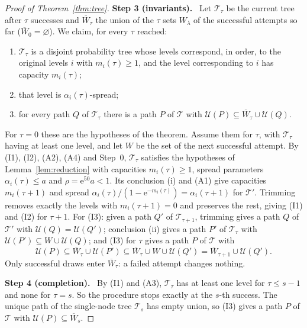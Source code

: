 \documentclass[11pt]{article}
\numberwithin{equation}{section}
\newcommand{\TT}{\mathcal T}
\newcommand{\UU}{\mathcal U}
\newcommand{\ee}{\mathrm e}
\newcommand{\step}[2]{\par\medskip\noindent\textbf{Step #1 (#2).}\ }
\begin{document}
\begin{proof}[Proof of Theorem~\ref{thm:tree}]
\step{3}{invariants}
Let $\TT_\tau$ be the current tree after $\tau$ successes and
$\overline W_\tau$ the union of the $\tau$ sets $W_\lambda$ of the
successful attempts so far ($\overline W_0=\varnothing$). We claim, for
every $\tau$ reached:
\begin{enumerate}[label=(I\arabic*),leftmargin=2.6em,itemsep=2pt]
 \item $\TT_\tau$ is a disjoint probability tree whose levels correspond,
 in order, to the original levels $i$ with $m_i(\tau)\ge1$, and the level
 corresponding to $i$ has capacity $m_i(\tau)$;
 \item that level is $\alpha_i(\tau)$-spread;
 \item for every path $Q$ of $\TT_\tau$ there is a path $P$ of $\TT$
 with $\UU(P)\subseteq\overline W_\tau\cup\UU(Q)$.
\end{enumerate}
For $\tau=0$ these are the hypotheses of the theorem. Assume them for
$\tau$, with $\TT_\tau$ having at least one level, and let $W$ be the
set of the next successful attempt. By (I1), (I2), (A2), (A4) and
Step~0, $\TT_\tau$ satisfies the hypotheses of
Lemma~\ref{lem:reduction} with capacities $m_i(\tau)\ge1$, spread
parameters $\alpha_i(\tau)\le a$ and $\rho=\ee^{50}a<1$. Its conclusion
(i) and (A1) give capacities $m_i(\tau+1)$ and spread
$\alpha_i(\tau)/(1-\ee^{-m_i(\tau)})=\alpha_i(\tau+1)$ for $\TT'$.
Trimming removes exactly the levels with $m_i(\tau+1)=0$ and preserves
the rest, giving (I1) and (I2) for $\tau+1$. For (I3): given a path
$Q'$ of $\TT_{\tau+1}$, trimming gives a path $Q$ of $\TT'$ with
$\UU(Q)=\UU(Q')$; conclusion (ii) gives a path $P'$ of $\TT_\tau$ with
$\UU(P')\subseteq W\cup\UU(Q)$; and (I3) for $\tau$ gives a path $P$ of
$\TT$ with
\[
 \UU(P)\subseteq\overline W_\tau\cup\UU(P')
 \subseteq\overline W_\tau\cup W\cup\UU(Q')
 =\overline W_{\tau+1}\cup\UU(Q').
\]
Only successful draws enter $\overline W_\tau$: a failed attempt changes
nothing.

\step{4}{completion}
By (I1) and (A3), $\TT_\tau$ has at least one level for $\tau\le s-1$
and none for $\tau=s$. So the procedure stops exactly at the $s$-th
success. The unique path of the single-node tree $\TT_s$ has empty
union, so (I3) gives a path $P$ of $\TT$ with
$\UU(P)\subseteq\overline W_s$.


\end{proof}
\end{document}
